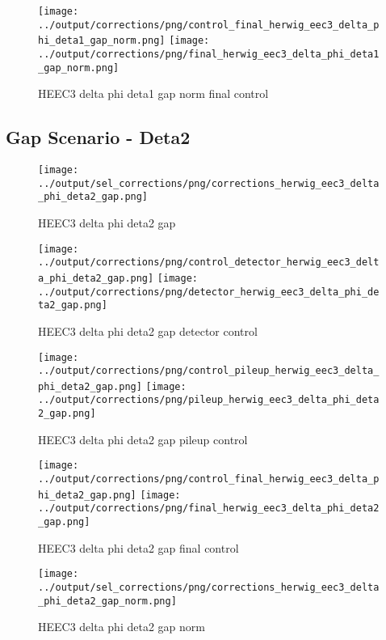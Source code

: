 \documentclass[11pt]{book}
\begin{document}
\begin{figure}[ht]
\centering
\texttt{[image: ../output/corrections/png/control\_final\_herwig\_eec3\_delta\_phi\_deta1\_gap\_norm.png]}
\texttt{[image: ../output/corrections/png/final\_herwig\_eec3\_delta\_phi\_deta1\_gap\_norm.png]}
\caption{HEEC3 delta phi deta1 gap norm final control}
\label{fig:HEEC3_delta_phi_deta1_gap_norm_final_control}
\end{figure}



\clearpage
\subsection{Gap Scenario - Deta2}
\begin{figure}[ht]
\centering
\texttt{[image: ../output/sel\_corrections/png/corrections\_herwig\_eec3\_delta\_phi\_deta2\_gap.png]}
\caption{HEEC3 delta phi deta2 gap}
\label{fig:HEEC3_delta_phi_deta2_gap}
\end{figure}


\begin{figure}[ht]
\centering
\texttt{[image: ../output/corrections/png/control\_detector\_herwig\_eec3\_delta\_phi\_deta2\_gap.png]}
\texttt{[image: ../output/corrections/png/detector\_herwig\_eec3\_delta\_phi\_deta2\_gap.png]}
\caption{HEEC3 delta phi deta2 gap detector control}
\label{fig:HEEC3_delta_phi_deta2_gap_detector_control}
\end{figure}

\begin{figure}[ht]
\centering
\texttt{[image: ../output/corrections/png/control\_pileup\_herwig\_eec3\_delta\_phi\_deta2\_gap.png]}
\texttt{[image: ../output/corrections/png/pileup\_herwig\_eec3\_delta\_phi\_deta2\_gap.png]}
\caption{HEEC3 delta phi deta2 gap pileup control}
\label{fig:HEEC3_delta_phi_deta2_gap_pileup_control}
\end{figure}


\begin{figure}[ht]
\centering
\texttt{[image: ../output/corrections/png/control\_final\_herwig\_eec3\_delta\_phi\_deta2\_gap.png]}
\texttt{[image: ../output/corrections/png/final\_herwig\_eec3\_delta\_phi\_deta2\_gap.png]}
\caption{HEEC3 delta phi deta2 gap final control}
\label{fig:HEEC3_delta_phi_deta2_gap_final_control}
\end{figure}

\begin{figure}[ht]
\centering
\texttt{[image: ../output/sel\_corrections/png/corrections\_herwig\_eec3\_delta\_phi\_deta2\_gap\_norm.png]}
\caption{HEEC3 delta phi deta2 gap norm}
\label{fig:HEEC3_delta_phi_deta2_gap_norm}
\end{figure}
\end{document}
